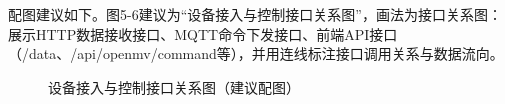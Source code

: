 \par 配图建议如下。图5-6建议为“设备接入与控制接口关系图”，画法为接口关系图：展示HTTP数据接收接口、MQTT命令下发接口、前端API接口（/data、/api/openmv/command等），并用连线标注接口调用关系与数据流向。
\begin{figure}[H]
\centering
{}
\caption{设备接入与控制接口关系图（建议配图）}
\label{fig:api_structure}
\end{figure}
